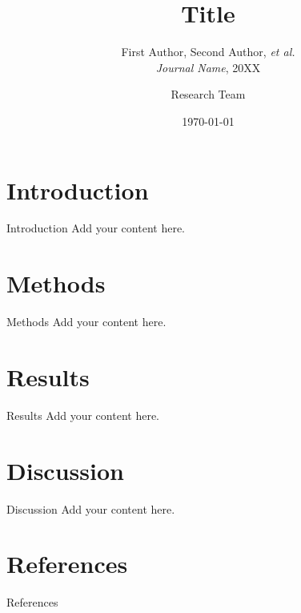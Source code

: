 \documentclass[aspectratio=169,t]{beamer}
\title{Title}
\subtitle{
First Author, Second Author, \textit{et al.} \\
\textit{Journal Name}, 20XX
}
\author{Research Team}
\institute{Department of Statistics \& Data Science}
\date{\today}
\providecommand\CUHKSourceDir{.}
\begin{document}
\maketitle

\section{Introduction}
\begin{frame}{Introduction}
Add your content here.
\end{frame}

\section{Methods}
\begin{frame}{Methods}
Add your content here.
\end{frame}

\section{Results}
\begin{frame}{Results}
Add your content here.
\end{frame}

\section{Discussion}
\begin{frame}{Discussion}
Add your content here.
\end{frame}

\section{References}
\begin{frame}[t,allowframebreaks]{References}
\end{frame}

\end{document}
